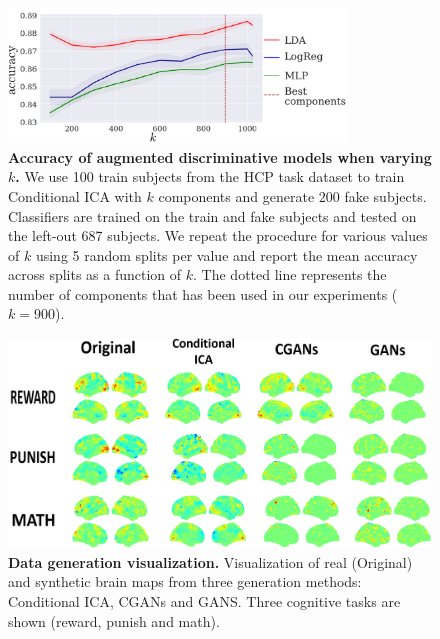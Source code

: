 \begin{figure}
  \centerline{\includegraphics[width=0.8\textwidth]{figures/condica/sensitivity.pdf}}
  \caption{\textbf{Accuracy of augmented discriminative models when
      varying $k$.} We use 100 train subjects from the HCP task dataset to train Conditional ICA with $k$ components and generate $200$ fake subjects.
    Classifiers are trained on the train and fake subjects and tested on the
    left-out 687 subjects. We repeat the procedure
    for various values of $k$ using 5 random splits per value and
    report the mean accuracy across splits as a function of $k$.
    The dotted line represents the number of components that has been
    used in our experiments ($k=900$).
  }
  \label{app:sensitivity:fig}
\end{figure}



\begin{figure}
  \centerline{\includegraphics[width=0.8\linewidth]{figures/condica/fake_real_viz_v3_redim_improved.png}}
  \caption{\textbf{Data generation visualization.} Visualization of real
    (Original) and synthetic brain maps from three generation methods:
    Conditional ICA, CGANs and GANS. Three cognitive tasks are shown (reward, punish and math).
  }
  \label{app:visualization:fig}
\end{figure}
